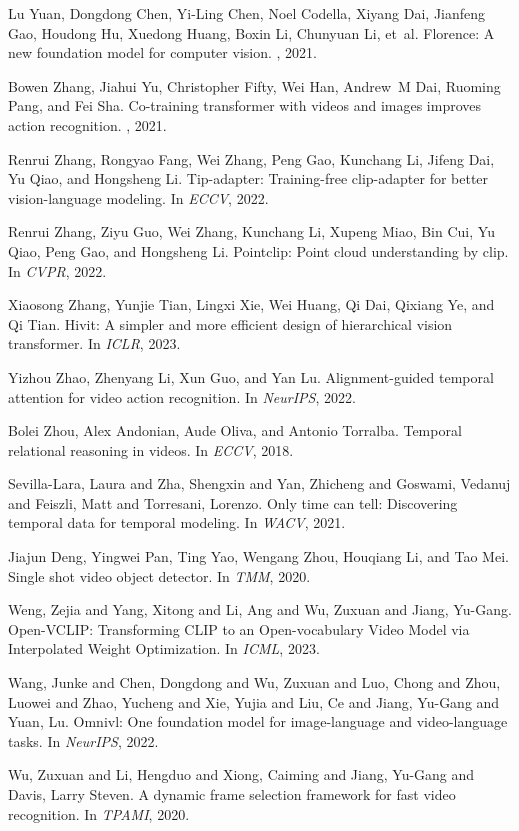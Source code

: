 \documentclass[10pt,twocolumn,letterpaper]{article}
\begin{document}
{\begin{thebibliography}{10}
Lu Yuan, Dongdong Chen, Yi-Ling Chen, Noel Codella, Xiyang Dai, Jianfeng Gao,
  Houdong Hu, Xuedong Huang, Boxin Li, Chunyuan Li, et~al.
\newblock Florence: A new foundation model for computer vision.
, 2021.

Bowen Zhang, Jiahui Yu, Christopher Fifty, Wei Han, Andrew~M Dai, Ruoming Pang,
  and Fei Sha.
\newblock Co-training transformer with videos and images improves action
  recognition.
, 2021.

Renrui Zhang, Rongyao Fang, Wei Zhang, Peng Gao, Kunchang Li, Jifeng Dai, Yu
  Qiao, and Hongsheng Li.
\newblock Tip-adapter: Training-free clip-adapter for better vision-language
  modeling.
\newblock In {\em ECCV}, 2022.

Renrui Zhang, Ziyu Guo, Wei Zhang, Kunchang Li, Xupeng Miao, Bin Cui, Yu Qiao,
  Peng Gao, and Hongsheng Li.
\newblock Pointclip: Point cloud understanding by clip.
\newblock In {\em CVPR}, 2022.

Xiaosong Zhang, Yunjie Tian, Lingxi Xie, Wei Huang, Qi Dai, Qixiang Ye, and Qi
  Tian.
\newblock Hivit: A simpler and more efficient design of hierarchical vision
  transformer.
\newblock In {\em ICLR}, 2023.

Yizhou Zhao, Zhenyang Li, Xun Guo, and Yan Lu.
\newblock Alignment-guided temporal attention for video action recognition.
\newblock In {\em NeurIPS}, 2022.

Bolei Zhou, Alex Andonian, Aude Oliva, and Antonio Torralba.
\newblock Temporal relational reasoning in videos.
\newblock In {\em ECCV}, 2018.

Sevilla-Lara, Laura and Zha, Shengxin and Yan, Zhicheng and Goswami, Vedanuj and Feiszli, Matt and Torresani, Lorenzo.
\newblock Only time can tell: Discovering temporal data for temporal modeling.
\newblock In {\em WACV}, 2021.

Jiajun Deng, Yingwei Pan, Ting Yao, Wengang Zhou, Houqiang Li, and Tao Mei.
\newblock Single shot video object detector.
\newblock In {\em TMM}, 2020.

Weng, Zejia and Yang, Xitong and Li, Ang and Wu, Zuxuan and Jiang, Yu-Gang.
\newblock Open-VCLIP: Transforming CLIP to an Open-vocabulary Video Model via Interpolated Weight Optimization.
\newblock In {\em ICML}, 2023.

Wang, Junke and Chen, Dongdong and Wu, Zuxuan and Luo, Chong and Zhou, Luowei and Zhao, Yucheng and Xie, Yujia and Liu, Ce and Jiang, Yu-Gang and Yuan, Lu.
\newblock Omnivl: One foundation model for image-language and video-language tasks.
\newblock In {\em NeurIPS}, 2022.

Wu, Zuxuan and Li, Hengduo and Xiong, Caiming and Jiang, Yu-Gang and Davis, Larry Steven.
\newblock A dynamic frame selection framework for fast video recognition.
\newblock In {\em TPAMI}, 2020.

\end{thebibliography}
 }
\end{document}
